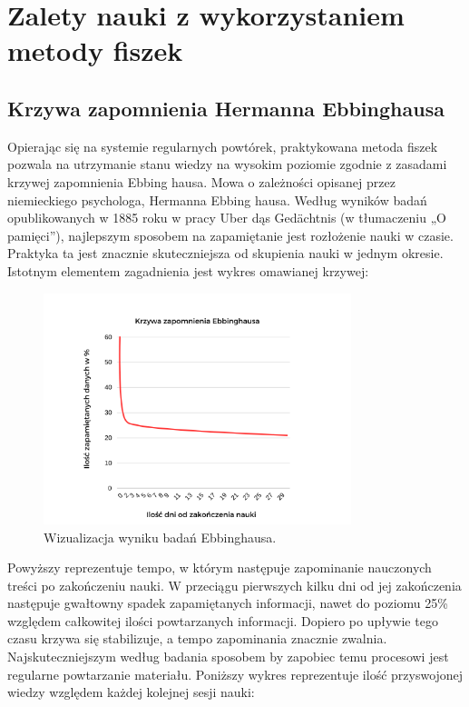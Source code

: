 \section{Zalety nauki z wykorzystaniem metody fiszek}

\subsection{Krzywa zapomnienia Hermanna Ebbinghausa}

Opierając się na systemie regularnych powtórek, praktykowana metoda fiszek pozwala na utrzymanie stanu wiedzy na wysokim poziomie zgodnie z zasadami krzywej zapomnienia Ebbing hausa. Mowa o zależności opisanej przez niemieckiego psychologa, Hermanna Ebbing hausa. Według wyników badań opublikowanych w 1885 roku w pracy \cite{1} Uber dąs Gedächtnis (w tłumaczeniu „O pamięci”), najlepszym sposobem na zapamiętanie jest rozłożenie nauki w czasie. Praktyka ta jest znacznie skuteczniejsza od skupienia nauki w jednym okresie. Istotnym elementem zagadnienia jest wykres omawianej krzywej:

\begin{figure}[H]
    \centering
    \includegraphics[width=0.8\textwidth]{chapters/chapter_2/krzywa1.png}
    \caption{Wizualizacja wyniku badań Ebbinghausa.}
    \label{img:krzywa1}
\end{figure}

Powyższy reprezentuje tempo, w którym następuje zapominanie nauczonych treści po zakończeniu nauki. W przeciągu pierwszych kilku dni od jej zakończenia następuje gwałtowny spadek zapamiętanych informacji, nawet do poziomu 25\% względem całkowitej ilości powtarzanych informacji. Dopiero po upływie tego czasu krzywa się stabilizuje, a tempo zapominania znacznie zwalnia. Najskuteczniejszym według badania sposobem by zapobiec temu procesowi jest regularne powtarzanie materiału. Poniższy wykres reprezentuje ilość przyswojonej wiedzy względem każdej kolejnej sesji nauki:

